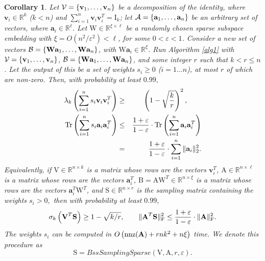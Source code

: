 \documentclass[11pt]{article}
\newcommand{\FNormS}[1]{\mbox{}\|#1\|_\mathrm{F}^2}
\newcommand{\TNormS}[1]{\mbox{}\|#1\|_2^2}
\newtheorem{corollary}[theorem]{Corollary}
\newcommand{\trace}{\text{\rm Tr}}
\newcommand{\mat}[1]{{\ensuremath{\bm{\mathrm{#1}}}}}
\def\ve{{\mathbf v}}
\def\matA{\mat{A}}
\def\matB{\mat{B}}
\def\matI{\mat{I}}
\def\matS{\mat{S}}
\def\matV{\mat{V}}
\def\matW{\mat{W}}
\def\nnz{{ \rm nnz }}
\def\math#1{$#1$}
\def\frac#1#2{{#1\over #2}}
\def\eqan#1{\begin{eqnarray*}
#1
\end{eqnarray*}}
\def\cl#1{{\cal #1}}
\def\a{{\mathbf a}}
\begin{document}
\begin{corollary}\label{lem:dualnnz}
Let \math{\cl V=\{\ve_1,\ldots,\ve_n\}} be a decomposition of the identity, where \math{\ve_i\in \mathbb{R}^{k}} ($k < n$) and
$\sum_{i=1}^n\ve_i\ve_i^T=\matI_{k}$; let \math{\cl A=\{\a_1,\ldots,\a_n\}} be an arbitrary set
of vectors, where \math{\a_i\in\mathbb{R}^{\ell}}. Let $\matW \in \mathbb{R}^{\xi \times \ell}$ be a randomly chosen
sparse subspace embedding with $\xi = O( n^2 / \varepsilon^2 ) < \ell$, for some $0 < \varepsilon < 1$. 
Consider a new set of vectors  \math{\cl B = \{\matW\a_1,\ldots, \matW\a_n\}},
with \math{\matW\a_i \in \mathbb{R}^{\xi}}. Run Algorithm \ref{alg1} with \math{\cl V=\{\ve_1,\ldots,\ve_n\}},
\math{\cl B = \{\matW\a_1,\ldots, \matW\a_n\}}, and some integer \math{r} such that \math{k < r \le n}. Let the output
of this be a set of weights \math{s_i\ge 0} ($i=1\ldots n$), at most \math{r} of which are non-zero. 
Then, with probability at least $0.99,$
\eqan{
\lambda_{k}\left(\sum_{i=1}^ns_i \ve_i \ve_i^T\right)
&\ge&
\left(1 - \sqrt{\frac{k}{r}}\right)^2,
\qquad\\
\trace\left(\sum_{i=1}^n s_i \a_i \a_i^T\right)
&\le&
\frac{1 + \varepsilon }{1 - \varepsilon} \cdot
\trace\left(\sum_{i=1}^n \a_i \a_i^T\right) \\
&=&
\frac{1 + \varepsilon }{1 - \varepsilon} \cdot
\sum_{i=1}^n \TNormS{\a_i}.
}
Equivalently,
if $\matV \in \mathbb{R}^{n \times k}$ is a matrix whose rows are the vectors $\ve_i^T$,
$\matA \in \mathbb{R}^{n \times \ell}$ is a matrix whose rows are the vectors $\a_i^T$,
$\matB = \matA \matW^T \in \mathbb{R}^{n \times \xi}$ is a matrix whose rows are the vectors $\a_i^T \matW^T$,
and
$\matS \in \mathbb{R}^{n \times r}$ is the sampling matrix containing 
the weights $s_i > 0, $ then with probability at least $0.99,$
\eqan{
\sigma_{k}\left( \matV^T \matS\right)
\ge
1 - \sqrt{{k}/{r}},
\qquad
\FNormS{\matA^T\matS}
\le
\frac{1 + \varepsilon }{1 - \varepsilon} \cdot
\FNormS{\matA}.
}
The weights $s_i$ can be computed in $O\left( \nnz(\matA) + rnk^2+n \xi \right)$ time. We denote this procedure as
$$\matS = BssSamplingSparse(\matV, \matA, r, \varepsilon).$$
\end{corollary}
\end{document}
